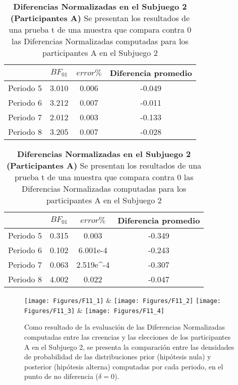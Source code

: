 \begin{table}[h]
\caption[Diferencias Normalizadas en el Subjuego 2; Participante A (Pruebas t de una muestra)]{\textbf{Diferencias Normalizadas en el Subjuego 2 (Participantes A)} Se presentan los resultados de una prueba t de una muestra que compara contra 0 las Diferencias Normalizadas computadas para los participantes A en el Subjuego 2}
\label{DN-S2-A-B}
\centering
\begin{tabular}{l | c c | c}
\toprule
\textbf{} & \textbf{$BF_{01}$} & \textbf{$error\%$} & \textbf{Diferencia promedio}\\
\midrule
Periodo 5 & 3.010 & 0.006 & -0.049\\
Periodo 6 & 3.212 & 0.007 & -0.011\\
Periodo 7 & 2.012 & 0.003 & -0.133\\
Periodo 8 & 3.205 & 0.007 & -0.028\\
\bottomrule
\end{tabular}
\end{table}

\begin{table}[h]
\caption[Diferencias Normalizadas en el Subjuego 2; Participante A (Pruebas t de una muestra)]{\textbf{Diferencias Normalizadas en el Subjuego 2 (Participantes A)} Se presentan los resultados de una prueba t de una muestra que compara contra 0 las Diferencias Normalizadas computadas para los participantes A en el Subjuego 2}
\label{DN-S2-DyE-B}
\centering
\begin{tabular}{l | c c | c}
\toprule
\textbf{} & \textbf{$BF_{01}$} & \textbf{$error\%$} & \textbf{Diferencia promedio}\\
\midrule
Periodo 5 & 0.315 & 0.003 & -0.349\\
Periodo 6 & 0.102 & 6.001e-4 & -0.243\\
Periodo 7 & 0.063 & 2.519e^-4 & -0.307\\
Periodo 8 & 4.002 & 0.022 & -0.047\\
\bottomrule
\end{tabular}
\end{table}
  

\begin{figure}[hp]
\centering
\texttt{[image: Figures/F11\_1]} & \texttt{[image: Figures/F11\_2]} 
\texttt{[image: Figures/F11\_3]} & \texttt{[image: Figures/F11\_4]} 
\decoRule
\caption[Evaluación de las Diferencias Normalizadas entre creencias y elecciones en los participantes A en el Subjuego 2 (Factor de Bayes)]{Como resultado de la evaluación de las Diferencias Normalizadas computadas entre las creencias y las elecciones de los participantes A en el Subjuego 2, se presenta la comparación entre las densidades de probabilidad de las distribuciones prior (hipótesis nula) y posterior (hipótesis alterna) computadas por cada periodo, en el punto de no diferencia ($\delta = 0$).}
\label{fig:DN_S2_A}
\end{figure}  


